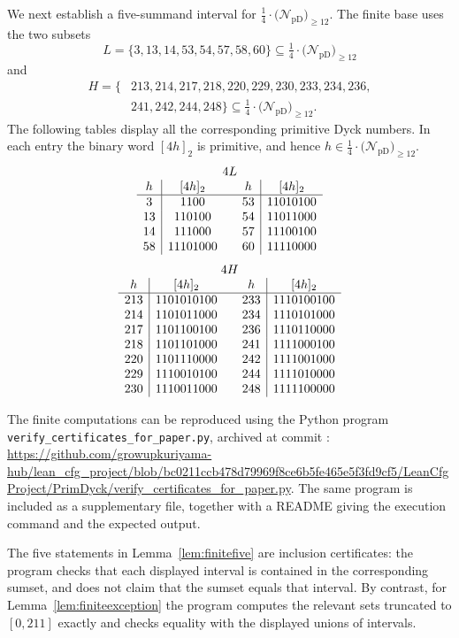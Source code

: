 \documentclass[12pt]{article}
\theoremstyle{plain}
\newcommand{\Pset}{\tfrac14\cdot
  \bigl(\mathcal N_{\mathrm{pD}}\bigr)_{\ge 12}}
\begin{document}
We next establish a five-summand interval for $\Pset$.  The finite base
uses the two subsets
\[
 L=\{3,13,14,53,54,57,58,60\}\subseteq\Pset
\]
and
\[
\begin{split}
 H=\{&213,214,217,218,220,229,230,233,234,236,\\
     &241,242,244,248\}\subseteq\Pset.
\end{split}
\]
The following tables display all the corresponding primitive Dyck
numbers.  In each entry the binary word $[4h]_2$ is primitive, and hence
$h\in\Pset$.
\[
\begin{array}{c|c@{\qquad}c|c}
\multicolumn{4}{c}{4L}\\
h&[4h]_2&h&[4h]_2\\ \hline
3&1100&53&11010100\\
13&110100&54&11011000\\
14&111000&57&11100100\\
58&11101000&60&11110000
\end{array}
\]
\[
\begin{array}{c|c@{\qquad}c|c}
\multicolumn{4}{c}{4H}\\
h&[4h]_2&h&[4h]_2\\ \hline
213&1101010100&233&1110100100\\
214&1101011000&234&1110101000\\
217&1101100100&236&1110110000\\
218&1101101000&241&1111000100\\
220&1101110000&242&1111001000\\
229&1110010100&244&1111010000\\
230&1110011000&248&1111100000
\end{array}
\]

The finite computations can be reproduced using the Python program
\texttt{verify\_certificates\_for\_paper.py}, archived at commit
:
\url{https://github.com/growupkuriyama-hub/lean_cfg_project/blob/bc0211ccb478d79969f8ce6b5fe465e5f3fd9cf5/LeanCfgProject/PrimDyck/verify_certificates_for_paper.py}.
The same program is included as a supplementary file, together with a
README giving the execution command and the expected output.

The five statements in Lemma~\ref{lem:finitefive} are inclusion
certificates: the program checks that each displayed interval is
contained in the corresponding sumset, and does not claim that the
sumset equals that interval.  By contrast, for
Lemma~\ref{lem:finiteexception} the program computes the relevant sets
truncated to $[0,211]$ exactly and checks equality with the displayed
unions of intervals.
\end{document}

